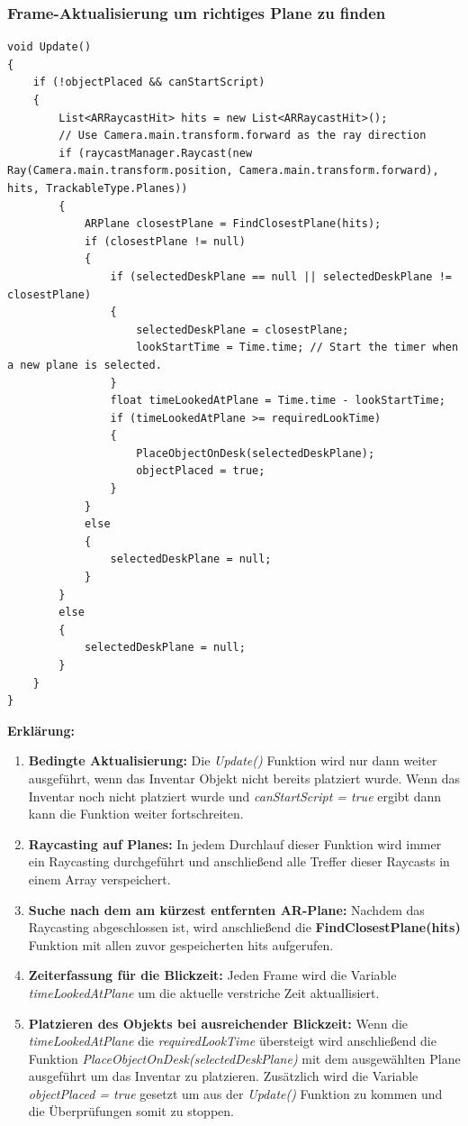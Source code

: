 \subsubsection{Frame-Aktualisierung um richtiges Plane zu finden}
\begin{lstlisting}[style=csharp, caption={}, label=code:Update]
void Update()
{
    if (!objectPlaced && canStartScript)
    {
        List<ARRaycastHit> hits = new List<ARRaycastHit>();
        // Use Camera.main.transform.forward as the ray direction
        if (raycastManager.Raycast(new Ray(Camera.main.transform.position, Camera.main.transform.forward), hits, TrackableType.Planes))
        {
            ARPlane closestPlane = FindClosestPlane(hits);
            if (closestPlane != null)
            {
                if (selectedDeskPlane == null || selectedDeskPlane != closestPlane)
                {
                    selectedDeskPlane = closestPlane;
                    lookStartTime = Time.time; // Start the timer when a new plane is selected.
                }
                float timeLookedAtPlane = Time.time - lookStartTime;
                if (timeLookedAtPlane >= requiredLookTime)
                {
                    PlaceObjectOnDesk(selectedDeskPlane);
                    objectPlaced = true;
                }
            }
            else
            {
                selectedDeskPlane = null;
            }
        }
        else
        {
            selectedDeskPlane = null;
        }
    }
}
\end{lstlisting}
\textbf{Erklärung:}
\begin{enumerate}
    \item \textbf{Bedingte Aktualisierung:} Die \textit{Update()} Funktion wird nur dann weiter ausgeführt, wenn das Inventar
    Objekt nicht bereits platziert wurde. Wenn das Inventar noch nicht platziert wurde und \textit{canStartScript = true}
    ergibt dann kann die Funktion weiter fortschreiten.
    \item \textbf{Raycasting auf Planes:} In jedem Durchlauf dieser Funktion wird immer ein Raycasting durchgeführt und
    anschließend alle Treffer dieser Raycasts in einem Array verspeichert.
    \item \textbf{Suche nach dem am kürzest entfernten AR-Plane:} Nachdem das Raycasting abgeschlossen ist, wird anschließend die
    \textbf{FindClosestPlane(hits)} Funktion mit allen zuvor gespeicherten hits aufgerufen.
    \item \textbf{Zeiterfassung für die Blickzeit:} Jeden Frame wird die Variable \textit{timeLookedAtPlane} um die aktuelle
    verstriche Zeit  aktuallisiert.
    \item \textbf{Platzieren des Objekts bei ausreichender Blickzeit:} Wenn die \textit{timeLookedAtPlane} die \textit{requiredLookTime}
    übersteigt wird anschließend die Funktion \textit{PlaceObjectOnDesk(selectedDeskPlane)} mit dem ausgewählten Plane
    ausgeführt um das Inventar zu platzieren. Zusätzlich wird die Variable \textit{objectPlaced = true} gesetzt um aus der \textit{Update()}
    Funktion zu kommen und die Überprüfungen somit zu stoppen.
\end{enumerate}
